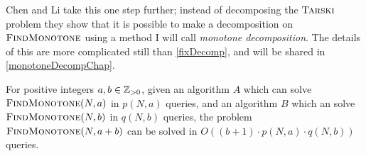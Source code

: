 Chen and Li take this one step further; instead of decomposing the $\textsc{Tarski}$ problem
they show that it is possible to make a decomposition on $\textsc{FindMonotone}$ using a method
I will call \emph{monotone decomposition}. The details
of this are more complicated still than \cref{fixDecomp}, and will be shared in \cref{monotoneDecompChap}.
\begin{theorem} \label{monDecomp}
  For positive integers $a, b \in \mathbb{Z}_{> 0}$, given an algorithm $A$
  which can solve $\textsc{FindMonotone}(N, a)$ in $p(N, a)$ queries, and an algorithm $B$
  which an solve $\textsc{FindMonotone}(N, b)$ in $q(N, b)$ queries, the problem $\textsc{FindMonotone}(N, a + b)$
  can be solved in $O((b + 1) \cdot p(N, a) \cdot q(N, b))$ queries.
\end{theorem}

